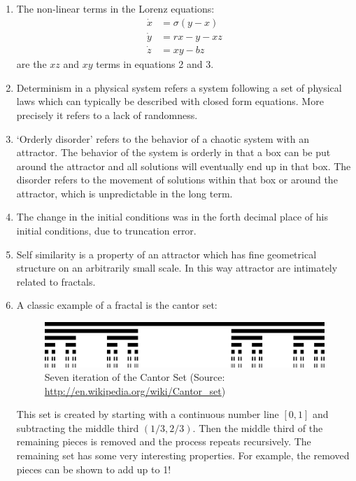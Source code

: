 \documentclass[11pt,oneside]{article}
\begin{document}
\begin{enumerate}
\item The non-linear terms in the Lorenz equations:
\begin{align}
\dot{x}&=\sigma(y-x)\\
\dot{y}&=rx-y-xz\\
\dot{z}&=xy-bz
\end{align}
are the $xz$ and $xy$ terms in equations 2 and 3. 

\item Determinism in a physical system refers a system following a set of physical laws which can typically be described with closed form equations. More precisely it refers to a lack of randomness.

\item `Orderly disorder' refers to the behavior of a chaotic system with an attractor.  The behavior of the system is orderly in that a box can be put around the attractor and all solutions will eventually end up in that box.  The disorder refers to the movement of solutions within that box or around the attractor, which is unpredictable in the long term. 

\item  The change in the initial conditions was in the forth decimal place of his initial conditions, due to truncation error. 

\item Self similarity is a property of an attractor which has fine geometrical structure on an arbitrarily small scale.  In this way attractor are intimately related to fractals. 

\item A classic example of a fractal is the cantor set:

\begin{figure}[!htbp]
   \centering
	\includegraphics[width=.85\textwidth]{Cantor_set_in_seven_iterations.pdf}
   \caption{Seven iteration of the Cantor Set (Source: \url{http://en.wikipedia.org/wiki/Cantor_set})}
\end{figure}

This set is created by starting with a continuous number line $[0,1]$ and subtracting the middle third $(1/3,2/3)$.  Then the middle third of the remaining pieces is removed and the process repeats recursively. The remaining set has some very interesting properties. For example, the removed pieces can be shown to add up to 1!


\end{enumerate}
\end{document}
